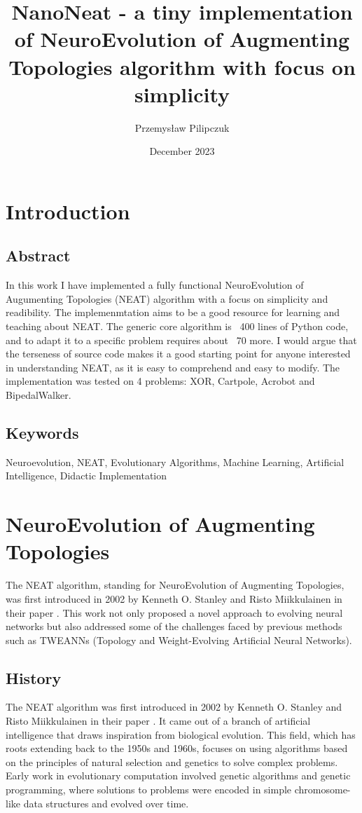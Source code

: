 \documentclass{article}
\title{NanoNeat - a tiny implementation of NeuroEvolution of Augmenting Topologies algorithm with focus on simplicity}
\author{Przemysław Pilipczuk}
\date{December 2023}
\begin{document}
\maketitle

\tableofcontents
\section{Introduction}
\subsection{Abstract}
In this work I have implemented a fully functional  NeuroEvolution of Augumenting Topologies (NEAT) algorithm 
with a focus on simplicity and readibility. The implemenmtation aims to be a good resource for learning and teaching about NEAT.
The generic core algorithm is ~400 lines of Python code, and to adapt it to a specific problem requires about ~70 
more. I would argue that the terseness of source code makes it a good starting point for anyone interested in understanding NEAT, 
as it is easy to comprehend and easy to modify.
The implementation was tested on 4 problems: XOR, Cartpole, Acrobot and BipedalWalker. 

\subsection{Keywords}
Neuroevolution, NEAT, Evolutionary Algorithms, Machine Learning, Artificial Intelligence, Didactic Implementation
\newpage
\section {NeuroEvolution of Augmenting Topologies}
The NEAT algorithm, standing for NeuroEvolution of Augmenting Topologies, was first introduced in 2002 by Kenneth O. Stanley
and Risto Miikkulainen in their paper \cite{originalNeat}. This work not only proposed a novel approach to evolving neural
networks but also addressed some of the challenges faced by previous methods such as TWEANNs (Topology and Weight-Evolving
Artificial Neural Networks).
\subsection{History}
The NEAT algorithm was first introduced in 2002 by Kenneth O. Stanley and Risto Miikkulainen in their paper \cite{originalNeat}. 
It came out of a branch of artificial intelligence that draws inspiration from biological evolution.
This field, which has roots extending back to the 1950s and 1960s,
focuses on using algorithms based on the principles of natural selection and genetics to solve complex problems.
Early work in evolutionary computation involved genetic algorithms and genetic programming,
where solutions to problems were encoded in simple chromosome-like data structures and evolved over time.
\end{document}
